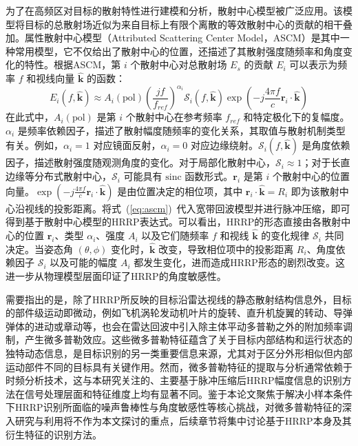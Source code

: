 为了在高频区对目标的散射特性进行建模和分析，散射中心模型被广泛应用。该模型将目标的总散射场近似为来自目标上有限个离散的等效散射中心的贡献的相干叠加。属性散射中心模型（Attributed Scattering Center Model，ASCM）是其中一种常用模型，它不仅给出了散射中心的位置，还描述了其散射强度随频率和角度变化的特性。根据ASCM，第 $i$ 个散射中心对总散射场 $E_s$ 的贡献 $E_i$ 可以表示为频率 $f$ 和视线向量 $\hat{\mathbf{k}}$ 的函数：
\begin{equation}
    E_i(f, \hat{\mathbf{k}}) \approx A_i(\text{pol}) \left(\frac{j f}{f_{ref}}\right)^{\alpha_i} \mathcal{S}_i(f, \hat{\mathbf{k}}) \exp\left(-j \frac{4\pi f}{c} \mathbf{r}_i \cdot \hat{\mathbf{k}}\right)
    \label{eq:ascm}
\end{equation}
在此式中，$A_i(\text{pol})$ 是第 $i$ 个散射中心在参考频率 $f_{ref}$ 和特定极化下的复幅度。$\alpha_i$ 是频率依赖因子，描述了散射幅度随频率的变化关系，其取值与散射机制类型有关。例如，$\alpha_i=1$ 对应镜面反射，$\alpha_i=0$ 对应边缘绕射。$\mathcal{S}_i(f, \hat{\mathbf{k}})$ 是角度依赖因子，描述散射强度随观测角度的变化。对于局部化散射中心，$\mathcal{S}_i \approx 1$；对于长直边缘等分布式散射中心，$\mathcal{S}_i$ 可能具有 $\text{sinc}$ 函数形式。$\mathbf{r}_i$ 是第 $i$ 个散射中心的位置向量。$\exp(-j \frac{4\pi f}{c} \mathbf{r}_i \cdot \hat{\mathbf{k}})$ 是由位置决定的相位项，其中 $\mathbf{r}_i \cdot \hat{\mathbf{k}} = R_i$ 即为该散射中心沿视线的投影距离。将式~(\ref{eq:ascm})~代入宽带回波模型并进行脉冲压缩，即可得到基于散射中心模型的HRRP表达式。可以看出，HRRP的形态直接由各散射中心的位置 $\mathbf{r}_i$、类型 $\alpha_i$、强度 $A_i$ 以及它们随频率 $f$ 和视线 $\hat{\mathbf{k}}$ 的变化规律 $\mathcal{S}_i$ 共同决定。当姿态角 $(\theta, \phi)$ 变化时，$\hat{\mathbf{k}}$ 改变，导致相位项中的投影距离 $R_i$、角度依赖因子 $\mathcal{S}_i$ 以及可能的幅度 $A_i$ 都发生变化，进而造成HRRP形态的剧烈改变。这进一步从物理模型层面印证了HRRP的角度敏感性。

需要指出的是，除了HRRP所反映的目标沿雷达视线的静态散射结构信息外，目标的部件级运动即微动，例如飞机涡轮发动机叶片的旋转、直升机旋翼的转动、导弹弹体的进动或章动等，也会在雷达回波中引入除主体平动多普勒之外的附加频率调制，产生微多普勒效应。这些微多普勒特征蕴含了关于目标内部结构和运行状态的独特动态信息，是目标识别的另一类重要信息来源，尤其对于区分外形相似但内部运动部件不同的目标具有关键作用。然而，微多普勒特征的提取与分析通常依赖于时频分析技术，这与本研究关注的、主要基于脉冲压缩后HRRP幅度信息的识别方法在信号处理层面和特征维度上均有显著不同。鉴于本论文聚焦于解决小样本条件下HRRP识别所面临的噪声鲁棒性与角度敏感性等核心挑战，对微多普勒特征的深入研究与利用将不作为本文探讨的重点，后续章节将集中讨论基于HRRP本身及其衍生特征的识别方法。

